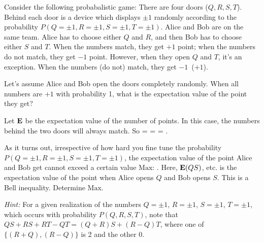 \newcommand{\vE}{\vb{E}}
\newcommand{\vS}{\vb{S}}
\newcommand{\vSA}{\vS^A}
\newcommand{\vSB}{\vS^B}
\newcommand{\Max}{\text{Max}}
\newcommand{\kpsi}{\ket{\psi}}
\newcommand{\up}{\uparrow}
\newcommand{\dn}{\downarrow}
\newcommand{\kupz}{\ket{\up_z}}
\newcommand{\kdnz}{\ket{\dn_z}}
\newcommand{\Sx}{S_x}
\newcommand{\Sz}{S_z}
\newcommand{\SxA}{\Sx^A}
\newcommand{\SzA}{\Sz^A}
\newcommand{\SxB}{\Sx^B}
\newcommand{\SzB}{\Sz^B}
\newcommand{\dhf}{\dfrac{1}{2}}

\begin{statement}{}
	Consider the following probabalistic game: There are four doors ($Q, R, S, T$).  Behind each door is a device which displays $\pm 1$ randomly according to the probability $P(Q=\pm1, R=\pm1, S=\pm1, T=\pm1)$.  Alice and Bob are on the same team.  Alice has to choose either $Q$ and $R$, and then Bob has to choose either $S$ and $T$.  When the numbers match, they get $+1$ point; when the numbers do not match, they get $-1$ point.  However, when they open $Q$ and $T$, it's an exception.  When the numbers (do not) match, they get $-1$~($+1$).
\end{statement}

\begin{problem} \label{1.1}
	Let's assume Alice and Bob open the doors completely randomly.  When all numbers are $+1$ with probability 1, what is the expectation value of the point they get?
\end{problem}

\begin{solution}
	Let $\vE$ be the expectation value of the number of points.  In this case, the numbers behind the two doors will always match.  So
	\beq
		\vE = 
		= 
		= .
	\eeq
	\vfix
\end{solution}



\begin{problem}
	As it turns out, irrespective of how hard you fine tune the probability $P(Q=\pm1, R=\pm1, S=\pm1, T=\pm1)$, the expectation value of the point Alice and Bob get cannot exceed a certain value $\Max$:
	\beq
		\frac{\vE(QS) + \vE(RS) + \vE(RT) - \vE(QT)}{4} \leq \Max.
	\eeq
	Here, $\vE(QS)$, etc. is the expectation value of the point when Alice opens $Q$ and Bob opens $S$.  This is a Bell inequality.  Determine $\Max$.
	
	\emph{Hint:} For a given realization of the numbers $Q = \pm1$, $R = \pm1$, $S = \pm1$, $T = \pm1$, which occurs with probability $P(Q, R, S, T)$, note that $QS + RS + RT - QT = (Q+R)S + (R-Q)T$, where one of $\{(R+Q), (R-Q)\}$ is 2 and the other 0.
\end{problem}

